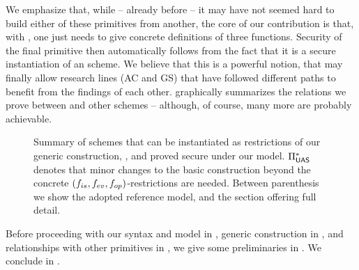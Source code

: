 We emphasize that, while -- already before \UAS -- it may have not seemed hard
to build either of these primitives from another, the core of our contribution
is that, with \UAS, one just needs to give concrete definitions of three
functions. Security of the final primitive then automatically follows from the
fact that it is a secure instantiation of an \UAS scheme. We believe that this
is a powerful notion, that may finally allow research lines (AC and GS) that
have followed different paths to benefit from the findings of each other.
 graphically summarizes the relations we prove between
\UAS and other schemes -- although, of course, many more are probably
achievable.

\begin{figure}[ht!]
  \centering
  \scalebox{0.9}{
    
  }
  \caption{Summary of schemes that can be instantiated as restrictions of our
    generic construction, \CUASGen, and proved secure under our \UAS model.
    $\Pi_{\mathsf{UAS}}^{\ast}$ denotes that minor changes to the basic construction
    beyond the concrete $(f_{is},f_{ev},f_{op})$-restrictions are needed.
    Between parenthesis we show the adopted reference model, and the section
    offering full detail.
  }
  \label{fig:relations}
\end{figure}

Before proceeding with our \UAS syntax and model in , generic
construction \CUASGen in , and relationships with other primitives
in , we give some preliminaries in . We conclude in
.

